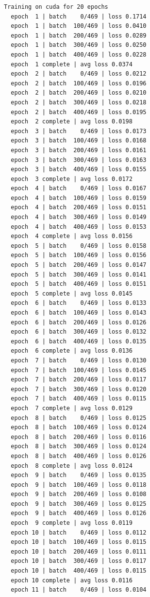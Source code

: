 \documentclass[
  letterpaper,
  DIV=11,
  numbers=noendperiod]{scrartcl}
\begin{document}
\label{task3}
\begin{verbatim}
Training on cuda for 20 epochs
  epoch  1 | batch    0/469 | loss 0.1714
  epoch  1 | batch  100/469 | loss 0.0410
  epoch  1 | batch  200/469 | loss 0.0289
  epoch  1 | batch  300/469 | loss 0.0250
  epoch  1 | batch  400/469 | loss 0.0228
  epoch  1 complete | avg loss 0.0374
  epoch  2 | batch    0/469 | loss 0.0212
  epoch  2 | batch  100/469 | loss 0.0196
  epoch  2 | batch  200/469 | loss 0.0210
  epoch  2 | batch  300/469 | loss 0.0218
  epoch  2 | batch  400/469 | loss 0.0195
  epoch  2 complete | avg loss 0.0198
  epoch  3 | batch    0/469 | loss 0.0173
  epoch  3 | batch  100/469 | loss 0.0168
  epoch  3 | batch  200/469 | loss 0.0161
  epoch  3 | batch  300/469 | loss 0.0163
  epoch  3 | batch  400/469 | loss 0.0155
  epoch  3 complete | avg loss 0.0172
  epoch  4 | batch    0/469 | loss 0.0167
  epoch  4 | batch  100/469 | loss 0.0159
  epoch  4 | batch  200/469 | loss 0.0151
  epoch  4 | batch  300/469 | loss 0.0149
  epoch  4 | batch  400/469 | loss 0.0153
  epoch  4 complete | avg loss 0.0156
  epoch  5 | batch    0/469 | loss 0.0158
  epoch  5 | batch  100/469 | loss 0.0156
  epoch  5 | batch  200/469 | loss 0.0147
  epoch  5 | batch  300/469 | loss 0.0141
  epoch  5 | batch  400/469 | loss 0.0151
  epoch  5 complete | avg loss 0.0145
  epoch  6 | batch    0/469 | loss 0.0133
  epoch  6 | batch  100/469 | loss 0.0143
  epoch  6 | batch  200/469 | loss 0.0126
  epoch  6 | batch  300/469 | loss 0.0132
  epoch  6 | batch  400/469 | loss 0.0135
  epoch  6 complete | avg loss 0.0136
  epoch  7 | batch    0/469 | loss 0.0130
  epoch  7 | batch  100/469 | loss 0.0145
  epoch  7 | batch  200/469 | loss 0.0117
  epoch  7 | batch  300/469 | loss 0.0120
  epoch  7 | batch  400/469 | loss 0.0115
  epoch  7 complete | avg loss 0.0129
  epoch  8 | batch    0/469 | loss 0.0125
  epoch  8 | batch  100/469 | loss 0.0124
  epoch  8 | batch  200/469 | loss 0.0116
  epoch  8 | batch  300/469 | loss 0.0124
  epoch  8 | batch  400/469 | loss 0.0126
  epoch  8 complete | avg loss 0.0124
  epoch  9 | batch    0/469 | loss 0.0135
  epoch  9 | batch  100/469 | loss 0.0118
  epoch  9 | batch  200/469 | loss 0.0108
  epoch  9 | batch  300/469 | loss 0.0125
  epoch  9 | batch  400/469 | loss 0.0126
  epoch  9 complete | avg loss 0.0119
  epoch 10 | batch    0/469 | loss 0.0112
  epoch 10 | batch  100/469 | loss 0.0115
  epoch 10 | batch  200/469 | loss 0.0111
  epoch 10 | batch  300/469 | loss 0.0117
  epoch 10 | batch  400/469 | loss 0.0115
  epoch 10 complete | avg loss 0.0116
  epoch 11 | batch    0/469 | loss 0.0104

\end{verbatim}
\end{document}
